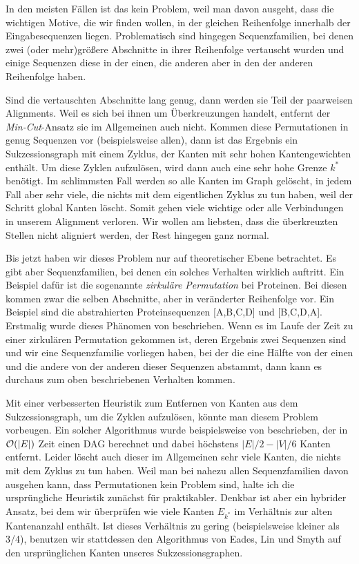In den meisten Fällen ist das kein Problem, weil man davon ausgeht, dass die wichtigen Motive, die wir finden wollen, in der gleichen Reihenfolge innerhalb der Eingabesequenzen liegen. Problematisch sind hingegen Sequenzfamilien, bei denen zwei (oder mehr)größere Abschnitte in ihrer Reihenfolge vertauscht wurden und einige Sequenzen diese in der einen, die anderen aber in den der anderen Reihenfolge haben. 

Sind die vertauschten Abschnitte lang genug, dann werden sie Teil der paarweisen Alignments. Weil es sich bei ihnen um Überkreuzungen handelt, entfernt der \emph{Min-Cut}-Ansatz sie im Allgemeinen auch nicht. Kommen diese Permutationen in genug Sequenzen vor (beispielsweise allen), dann ist das Ergebnis ein Sukzessionsgraph mit einem Zyklus, der Kanten mit sehr hohen Kantengewichten enthält. Um diese Zyklen aufzulösen, wird dann auch eine sehr hohe Grenze $k^{*}$ benötigt. Im schlimmsten Fall werden so alle Kanten im Graph gelöscht, in jedem Fall aber sehr viele, die nichts mit dem eigentlichen Zyklus zu tun haben, weil der Schritt global Kanten löscht. Somit gehen viele wichtige oder alle Verbindungen in unserem Alignment verloren. Wir wollen am liebsten, dass die überkreuzten Stellen nicht aligniert werden, der Rest hingegen ganz normal.

Bis jetzt haben wir dieses Problem nur auf theoretischer Ebene betrachtet. Es gibt aber Sequenzfamilien, bei denen ein solches Verhalten wirklich auftritt. Ein Beispiel dafür ist die sogenannte \emph{zirkuläre Permutation} bei Proteinen. Bei diesen kommen zwar die selben Abschnitte, aber in veränderter Reihenfolge vor. Ein Beispiel sind die abstrahierten Proteinsequenzen [A,B,C,D] und [B,C,D,A]. Erstmalig wurde dieses Phänomen von \cite{chhe79} beschrieben. Wenn es im Laufe der Zeit zu einer zirkulären Permutation gekommen ist, deren Ergebnis zwei Sequenzen sind und wir eine Sequenzfamilie vorliegen haben, bei der die eine Hälfte von der einen und die andere von der anderen dieser Sequenzen abstammt, dann kann es durchaus zum oben beschriebenen Verhalten kommen.

Mit einer verbesserten Heuristik zum Entfernen von Kanten aus dem Sukzessionsgraph, um die Zyklen aufzulösen, könnte man diesem Problem vorbeugen. Ein solcher Algorithmus wurde beispielsweise von \cite{els93} beschrieben, der in $\mathcal{O}(|E|)$ Zeit einen DAG berechnet und dabei höchstens $|E|/2 - |V|/6$ Kanten entfernt. Leider löscht auch dieser im Allgemeinen sehr viele Kanten, die nichts mit dem Zyklus zu tun haben. Weil man bei nahezu allen Sequenzfamilien davon ausgehen kann, dass Permutationen kein Problem sind, halte ich die ursprüngliche Heuristik zunächst für praktikabler. Denkbar ist aber ein hybrider Ansatz, bei dem wir überprüfen wie viele Kanten $E_{k^{*}}$ im Verhältnis zur alten Kantenanzahl enthält. Ist dieses Verhältnis zu gering (beispielsweise kleiner als 3/4), benutzen wir stattdessen den Algorithmus von Eades, Lin und Smyth auf den ursprünglichen Kanten unseres Sukzessionsgraphen.

